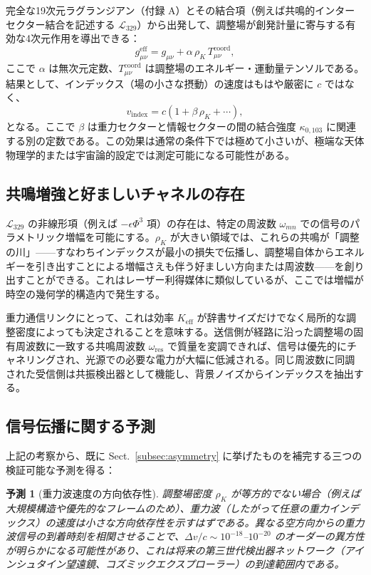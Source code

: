 \documentclass[12pt,a4paper]{article}
\newcommand{\Keff}{K_{\mathrm{eff}}}
\newtheorem{prediction}{予測}   %
\begin{document}
	完全な19次元ラグランジアン（付録 A）とその結合項（例えば共鳴的インターセクター結合を記述する \(\mathcal{L}_{329}\)）から出発して、調整場が創発計量に寄与する有効な4次元作用を導出できる：
	\begin{equation}
		g_{\mu\nu}^{\mathrm{eff}} = g_{\mu\nu} + \alpha \, \rho_K \, T_{\mu\nu}^{\mathrm{coord}},
	\end{equation}
	ここで \(\alpha\) は無次元定数、\(T_{\mu\nu}^{\mathrm{coord}}\) は調整場のエネルギー・運動量テンソルである。結果として、インデックス（場の小さな摂動）の速度はもはや厳密に \(c\) ではなく、
	\begin{equation}
		v_{\mathrm{index}} = c \left(1 + \beta \, \rho_K + \cdots \right),
	\end{equation}
	となる。ここで \(\beta\) は重力セクターと情報セクターの間の結合強度 \(\kappa_{0,103}\) に関連する別の定数である。この効果は通常の条件下では極めて小さいが、極端な天体物理学的または宇宙論的設定では測定可能になる可能性がある。
	
	\subsection{共鳴増強と好ましいチャネルの存在}
	
	\(\mathcal{L}_{329}\) の非線形項（例えば \(-\epsilon \Phi^3\) 項）の存在は、特定の周波数 \(\omega_{mn}\) での信号のパラメトリック増幅を可能にする。\(\rho_K\) が大きい領域では、これらの共鳴が「調整の川」——すなわちインデックスが最小の損失で伝播し、調整場自体からエネルギーを引き出すことによる増幅さえも伴う好ましい方向または周波数——を創り出すことができる。これはレーザー利得媒体に類似しているが、ここでは増幅が時空の幾何学的構造内で発生する。
	
	重力通信リンクにとって、これは効率 \(\Keff\) が辞書サイズだけでなく局所的な調整密度によっても決定されることを意味する。送信側が経路に沿った調整場の固有周波数に一致する共鳴周波数 \(\omega_{\mathrm{res}}\) で質量を変調できれば、信号は優先的にチャネリングされ、光源での必要な電力が大幅に低減される。同じ周波数に同調された受信側は共振検出器として機能し、背景ノイズからインデックスを抽出する。
	
	\subsection{信号伝播に関する予測}
	
	上記の考察から、既に Sect.~\ref{subsec:asymmetry} に挙げたものを補完する三つの検証可能な予測を得る：
	
	\begin{prediction}[重力波速度の方向依存性]
		調整場密度 \(\rho_K\) が等方的でない場合（例えば大規模構造や優先的なフレームのため）、重力波（したがって任意の重力インデックス）の速度は小さな方向依存性を示すはずである。異なる空方向からの重力波信号の到着時刻を相関させることで、\(\Delta v/c \sim 10^{-18}\)–\(10^{-20}\) のオーダーの異方性が明らかになる可能性があり、これは将来の第三世代検出器ネットワーク（アインシュタイン望遠鏡、コズミックエクスプローラー）の到達範囲内である。
	\end{prediction}
	
\end{document}
